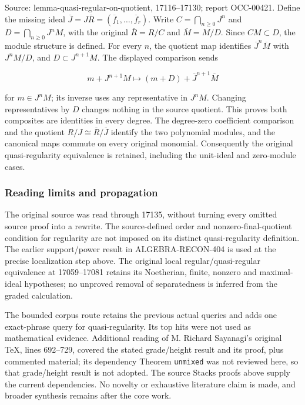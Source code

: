 Source: lemma-quasi-regular-on-quotient, 17116--17130; report OCC-00421. Define the missing ideal \(\overline J=J\overline R=(\overline f_1,\ldots,\overline f_r)\). Write \(C=\bigcap_{n\geq0}J^n\) and \(D=\bigcap_{n\geq0}J^nM\), with the original \(\overline R=R/C\) and \(\overline M=M/D\). Since \(CM\subset D\), the module structure is defined. For every \(n\), the quotient map identifies \(\overline J^n\overline M\) with \(J^nM/D\), and \(D\subset J^{n+1}M\). The displayed comparison sends

\[
m+J^{n+1}M\longmapsto (m+D)+\overline J^{n+1}\overline M
\]

for \(m\in J^nM\); its inverse uses any representative in \(J^nM\). Changing representatives by \(D\) changes nothing in the source quotient. This proves both composites are identities in every degree. The degree-zero coefficient comparison and the quotient \(R/J\cong\overline R/\overline J\) identify the two polynomial modules, and the canonical maps commute on every original monomial. Consequently the original quasi-regularity equivalence is retained, including the unit-ideal and zero-module cases.

\subsubsection{Reading limits and propagation}\label{algebra-proof-006-reading-limits-and-propagation}

The original source was read through 17135, without turning every omitted source proof into a rewrite. The source-defined order and nonzero-final-quotient condition for regularity are not imposed on its distinct quasi-regularity definition. The earlier support/power result in ALGEBRA-RECON-404 is used at the precise localization step above. The original local regular/quasi-regular equivalence at 17059--17081 retains its Noetherian, finite, nonzero and maximal-ideal hypotheses; no unproved removal of separatedness is inferred from the graded calculation.

The bounded corpus route retains the previous actual queries and adds one exact-phrase query for quasi-regularity. Its top hits were not used as mathematical evidence. Additional reading of M. Richard Sayanagi's original TeX, lines 692--729, covered the stated grade/height result and its proof, plus commented material; its dependency Theorem \texttt{unmixed} was not reviewed here, so that grade/height result is not adopted. The source Stacks proofs above supply the current dependencies. No novelty or exhaustive literature claim is made, and broader synthesis remains after the core work.
